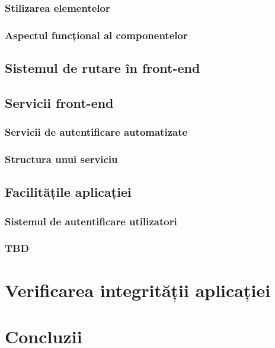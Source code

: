 \documentclass[12pt,a4paper]{report}
\theoremstyle{definition}
\theoremstyle{remark}
\begin{document}
\subsection{Stilizarea elementelor}

\subsection{Aspectul funcțional al componentelor}

\newpage

\section{Sistemul de rutare în front-end}

\newpage

\section{Servicii front-end}

\subsection{Servicii de autentificare automatizate}

\subsection{Structura unui serviciu}

\newpage

\section{Facilitățile aplicației}

\subsection{Sistemul de autentificare utilizatori}

\subsection{TBD}

\chapter{Verificarea integrității aplicației}

\chapter{Concluzii}



\end{document}
